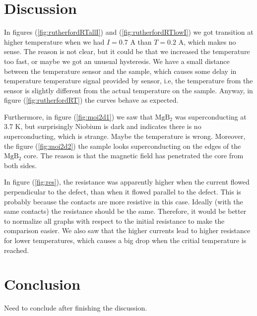 \documentclass{comjnl}
\newcommand*\chem[1]{\ensuremath{\mathrm{#1}}}
\begin{document}
\section{Discussion} \label{Sec:Discussion}
In figures (\ref{fig:rutherfordRTallI}) and (\ref{fig:rutherfordRTlowI}) we got transition at higher temperature when we had $I=$0.7 A than $T=0.2$ A, which makes no sense. The reason is not clear, but it could be that we increased the temperature too fast, or maybe we got an unusual hysteresis. We have a small distance between the temperature sensor and the sample, which causes some delay in temperature temperature signal provided by sensor, i.e, the temperature from the sensor is slightly different from the actual temperature on the sample. Anyway, in figure (\ref{fig:rutherfordRT}) the curves behave as expected. 

Furthermore, in figure (\ref{fig:moi2d1}) we saw that \chem{MgB_2} was superconducting at 3.7 K, but surprisingly Niobium is dark and indicates there is no superconducting, which is strange. Maybe the temperature is wrong. Moreover, the figure (\ref{fig:moi2d2}) the sample looks superconducting on the edges of the \chem{MgB_2} core. The reason is that the magnetic field has penetrated the core from both sides. 

In figure (\ref{fig:res}), the resistance was apparently higher when the current flowed perpendicular to the defect, than when it flowed parallel to the defect. This is probably because the contacts are more resistive in this case. Ideally (with the same contacts) the resistance should be the same. Therefore, it would be better to normalize all graphs with respect to the initial resistance to make the comparison easier. We also saw that the higher currents lead to higher resistance for lower temperatures, which causes a big drop when the critial temperature is reached. 

\section{Conclusion} \label{Sec:Conclusion}
Need to conclude after finishing the discussion.

\end{document}
